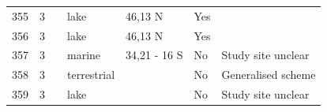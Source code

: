 \documentclass[12pt]{article}
\begin{document}
\begin{landscape}
\begin{table}[h!]
{\begin{tabular}{p{2.8cm}p{1.3cm}p{3cm}p{2.2cm}p{2.5cm}lp{8.2cm}}
        355   & 3 & \cite{Cohen2003}    & lake  & 46,13 N & Yes   &       \\
        356   & 3 & \cite{Cohen2003}    & lake  & 46,13 N & Yes   &       \\
        357   & 3 & \cite{Yodzis1998} & marine & 34,21 - 16 S & No    & Study site unclear \\
        358   & 3 & \cite{Schroter2003}  & terrestrial &       & No    & Generalised scheme \\
        359   & 3 & \cite{Baiser2012}  & lake  &       & No    & Study site unclear \\
        \hline
      \end{tabular}%
        }
    \end{table}%
  \end{landscape}

  \clearpage
\end{document}
